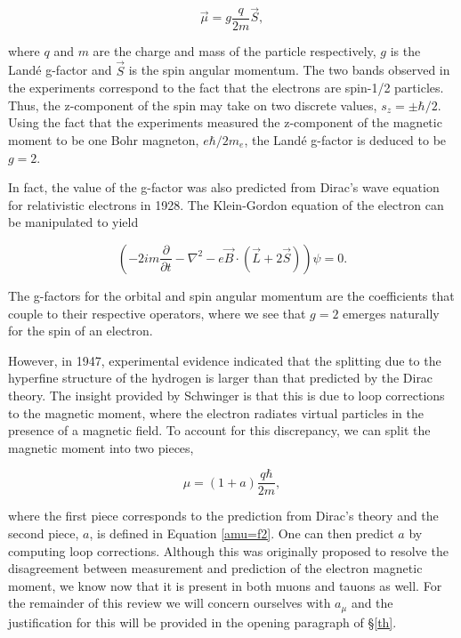 \documentclass{article}
\numberwithin{equation}{section} %
\begin{document}
\begin{equation}
\vec{\mu}=g\frac{q}{2m}\vec{S},
\label{magnetic moment}
\end{equation}

\noindent where $q$ and $m$ are the charge and mass of the particle respectively, $g$ is the Land\'e g-factor and $\vec{S}$ is the spin angular momentum. The two bands observed in the experiments correspond to the fact that the electrons are spin-1/2 particles. Thus, the z-component of the spin may take on two discrete values, $s_z=\pm \hbar/2$. Using the fact that the experiments measured the z-component of the magnetic moment to be one Bohr magneton, $e\hbar/2m_e$, the Land\'e g-factor is deduced to be $g=2$.

In fact, the value of the g-factor was also predicted from Dirac's wave equation for relativistic electrons in 1928. The Klein-Gordon equation of the electron can be manipulated\cite{zee} to yield 

\begin{equation}
\left(-2im\frac{\partial}{\partial t} - \nabla^2 - e\vec{B}\cdot (\vec{L} + 2 \vec{S}) \right)\psi=0. 
\label{KGeq for rel e}
\end{equation}

\noindent The g-factors for the orbital and spin angular momentum are the coefficients that couple to their respective operators, where we see that $g=2$ emerges naturally for the spin of an electron.

However, in 1947, experimental evidence indicated that the splitting due to the hyperfine structure of the hydrogen is larger than that predicted by the Dirac theory\cite{lehnerg2}. The insight provided by Schwinger is that this is due to loop corrections to the magnetic moment, where the electron radiates virtual particles in the presence of a magnetic field. To account for this discrepancy, we can split the magnetic moment into two pieces,

\begin{equation}
\mu = (1+a)\frac{q\hbar}{2m},
\end{equation}

\noindent where the first piece corresponds to the prediction from Dirac's theory and the second piece, $a$, is defined in Equation \ref{amu=f2}. One can then predict $a$ by computing loop corrections. Although this was originally proposed to resolve the disagreement between measurement and prediction of the electron magnetic moment, we know now that it is present in both muons and tauons as well. For the remainder of this review we will concern ourselves with $a_\mu$ and the justification for this will be provided in the opening paragraph of \S\ref{th}.
\end{document}
